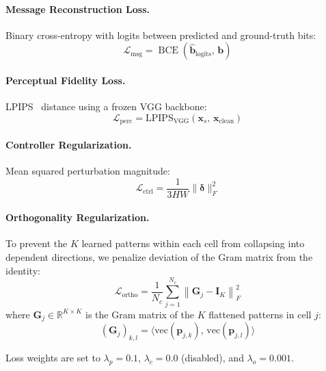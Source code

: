 \documentclass[10pt, twocolumn]{article}
\newcommand{\R}{\mathbb{R}}
\newcommand{\Lcal}{\mathcal{L}}
\DeclareMathOperator{\BCE}{BCE}
\begin{document}
\paragraph{Message Reconstruction Loss.}
Binary cross-entropy with logits between predicted and ground-truth bits:
\begin{equation}
    \Lcal_\text{msg} = \BCE(\hat{\mathbf{b}}_\text{logits},\, \mathbf{b})
    \label{eq:loss_msg}
\end{equation}

\paragraph{Perceptual Fidelity Loss.}
LPIPS~\cite{zhang2018unreasonable} distance using a frozen VGG backbone:
\begin{equation}
    \Lcal_\text{perc} = \text{LPIPS}_\text{VGG}(\mathbf{x}_s,\, \mathbf{x}_\text{clean})
    \label{eq:loss_perc}
\end{equation}

\paragraph{Controller Regularization.}
Mean squared perturbation magnitude:
\begin{equation}
    \Lcal_\text{ctrl} = \frac{1}{3HW} \|\bm{\delta}\|_F^2
    \label{eq:loss_ctrl}
\end{equation}

\paragraph{Orthogonality Regularization.}
To prevent the $K$ learned patterns within each cell from collapsing into dependent directions, we penalize deviation of the Gram matrix from the identity:
\begin{equation}
    \Lcal_\text{ortho} = \frac{1}{N_c} \sum_{j=1}^{N_c} \left\| \mathbf{G}_j - \mathbf{I}_K \right\|_F^2
    \label{eq:loss_ortho}
\end{equation}
where $\mathbf{G}_j \in \R^{K \times K}$ is the Gram matrix of the $K$ flattened patterns in cell $j$:
\begin{equation}
    (\mathbf{G}_j)_{k,l} = \langle \text{vec}(\mathbf{p}_{j,k}),\, \text{vec}(\mathbf{p}_{j,l}) \rangle
\end{equation}

Loss weights are set to $\lambda_p = 0.1$, $\lambda_c = 0.0$ (disabled), and $\lambda_o = 0.001$.
\end{document}
